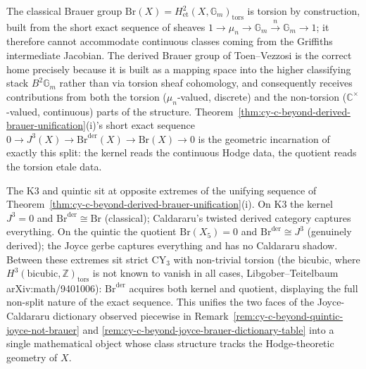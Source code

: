 \begin{remark}
\label{rem:cy-c-beyond-derived-brauer-correct-home}
The classical Brauer group $\mathrm{Br}(X) = H^2_{\mathrm{et}}(X,
\mathbb{G}_m)_{\mathrm{tors}}$ is torsion by construction, built from
the short exact sequence of sheaves $1 \to \mu_n \to \mathbb{G}_m
\xrightarrow{n} \mathbb{G}_m \to 1$; it therefore cannot accommodate
continuous classes coming from the Griffiths intermediate Jacobian.
The derived Brauer group of Toen--Vezzosi is the correct home
precisely because it is built as a mapping space into the higher
classifying stack $B^2 \mathbb{G}_m$ rather than via torsion sheaf
cohomology, and consequently receives contributions from both the
torsion ($\mu_n$-valued, discrete) and the non-torsion
($\mathbb{C}^\times$-valued, continuous) parts of the structure.
Theorem~\ref{thm:cy-c-beyond-derived-brauer-unification}(i)'s short
exact sequence
$0 \to J^3(X) \to \mathrm{Br}^{\mathrm{der}}(X) \to \mathrm{Br}(X) \to
0$ is the geometric incarnation of exactly this split: the kernel
reads the continuous Hodge data, the quotient reads the torsion etale
data.
\end{remark}

\begin{remark}
\label{rem:cy-c-beyond-brauer-k3-vs-quintic}
The K3 and quintic sit at opposite extremes of the unifying sequence
of
Theorem~\ref{thm:cy-c-beyond-derived-brauer-unification}(i). On K3
the kernel $J^3 = 0$ and $\mathrm{Br}^{\mathrm{der}} \cong
\mathrm{Br}$ (classical); Caldararu's twisted derived category
captures everything. On the quintic the quotient
$\mathrm{Br}(X_5) = 0$ and $\mathrm{Br}^{\mathrm{der}} \cong J^3$
(genuinely derived); the Joyce gerbe captures everything and has no
Caldararu shadow. Between these extremes sit strict CY$_3$ with
non-trivial torsion (the bicubic, where
$H^3(\text{bicubic}, \mathbb{Z})_{\mathrm{tors}}$ is not known to
vanish in all cases, Libgober--Teitelbaum arXiv:math/9401006):
$\mathrm{Br}^{\mathrm{der}}$ acquires both kernel and quotient,
displaying the full non-split nature of the exact sequence. This
unifies the two faces of the Joyce-Caldararu dictionary observed
piecewise in
Remark~\ref{rem:cy-c-beyond-quintic-joyce-not-brauer} and
\ref{rem:cy-c-beyond-joyce-brauer-dictionary-table} into a single
mathematical object whose class structure tracks the Hodge-theoretic
geometry of $X$.
\end{remark}


